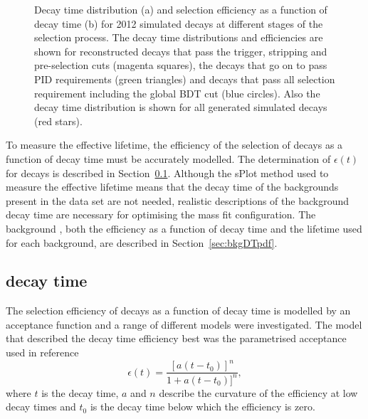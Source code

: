 \begin{figure}[tbp]
\begin{subfigure}[b]{0.48\textwidth}
   \end{subfigure}
    \caption{Decay time distribution (a) and selection efficiency as a function of decay time (b) for 2012 \bsmumu simulated decays at different stages of the selection process. The decay time distributions and efficiencies are shown for reconstructed decays that pass the trigger, stripping and pre-selection cuts (magenta squares), the decays that go on to pass PID requirements (green triangles) and decays that pass all selection requirement including the global BDT cut (blue circles). Also the decay time distribution is shown for all generated simulated decays (red stars).} %
    \label{fig:accpteg}
\end{figure}

To measure the \bsmumu effective lifetime, the efficiency of the selection of \bsmumu decays as a function of decay time must be accurately modelled. The determination of $\epsilon(t)$ for \bsmumu decays is described in Section~\ref{sec:signalDTpdf}. Although the sPlot method used to measure the \bsmumu effective lifetime means that the decay time \pdfs of the backgrounds present in the data set are not needed, realistic  descriptions of the background decay time \pdfs are necessary for optimising the mass fit configuration. The background \pdfs, both the efficiency as a function of decay time and the lifetime used for each background, are described in Section~\ref{sec:bkgDTpdf}.


\subsection[\bsmumu decay time \pdf]{\boldmath{\bsmumu} decay time \pdf}%
\label{sec:signalDTpdf}
The selection efficiency of \bsmumu decays as a function of decay time is modelled by an acceptance function and a range of different models were investigated. The model that described the \bsmumu decay time efficiency best was the parametrised acceptance used in reference~\cite{LHCb:2011ab} 
\begin{equation}
\epsilon(t) = \frac{[a(t - t_{0})]^{n}}{1 + a(t - t_{0})]^{n}},
\label{eq:accpt}
\end{equation}
where $t$ is the decay time, $a$ and $n$ describe the curvature of the efficiency at low decay times and $t_0$ is the decay time below which the efficiency is zero. 


